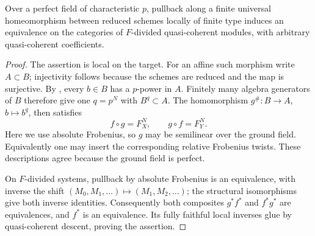 \begin{lemma}\label{lem:DE-Fdiv-universal-homeomorphism}
Over a perfect field of characteristic $p$, pullback along a finite universal homeomorphism between reduced schemes locally of finite type induces an equivalence on the categories of $F$-divided quasi-coherent modules, with arbitrary quasi-coherent coefficients.
\end{lemma}
\begin{proof}
The assertion is local on the target.  For an affine such morphism write $A\subset B$; injectivity follows because the schemes are reduced and the map is surjective.  By \cite[Lemma~29.47.9, Tag~0CNF]{StacksProject}, every $b\in B$ has a $p$-power in $A$.  Finitely many algebra generators of $B$ therefore give one $q=p^N$ with $B^q\subset A$.  The homomorphism $g^\#:B\to A$, $b\mapsto b^q$, then satisfies
\[
             f\circ g=F_X^N,\qquad g\circ f=F_Y^N.
\]
Here we use absolute Frobenius, so $g$ may be semilinear over the ground field.  Equivalently one may insert the corresponding relative Frobenius twists.  These descriptions agree because the ground field is perfect.

On $F$-divided systems, pullback by absolute Frobenius is an equivalence, with inverse the shift $(M_0,M_1,\ldots)\mapsto(M_1,M_2,\ldots)$; the structural isomorphisms give both inverse identities.  Consequently both composites $g^*f^*$ and $f^*g^*$ are equivalences, and $f^*$ is an equivalence.  Its fully faithful local inverses glue by quasi-coherent descent, proving the assertion.
\end{proof}

